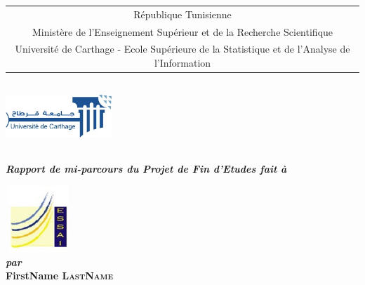 \documentclass{article}
\title{\reportSubject}
\author{\reportAuthor}
\newcommand{\reportTitle} {%
  \textsc{Projet de Fin d'\'etudes}
}
\newcommand{\reportAuthor} {%
  FirstName \textsc{LastName}%
}
\newcommand{\ESSAI} {%
  Ecole Sup\'erieure de la Statistique et de l'Analyse de l'Information
}
\begin{document}
\thispagestyle{empty}
\begin{titlepage}
\begin{center}



{%
  \fontsize{9pt}{9pt}\selectfont%
  \begin{tabular}{c}
    R\'epublique Tunisienne \\
    Minist\`ere de l'Enseignement Supérieur et de la Recherche Scientifique \\%
    Universit\'e de Carthage - \ESSAI{}  \\
  \end{tabular}
}

\vspace{1cm}

\includegraphics[width=4cm, height=2.5cm]{universite-carthage.jpg}



\vspace{30pt} {%
  \renewcommand*{\familydefault}{\defaultFont}
  \fontsize{46pt}{46pt}\selectfont%
}

\vspace{10pt}
\textbf{\textit{Rapport de mi-parcours du Projet de Fin d'Etudes fait à }}

\includegraphics[width=2.5cm, height=2.5cm]{logo-essai.jpg}\\

\vspace{30pt}
\textbf{\textit{par}}\\
\vspace{10pt} {%
  \fontsize{18pt}{18pt}\selectfont%
  \textbf{\reportAuthor}\\
}%


\end{center}
\end{titlepage}
\end{document}
